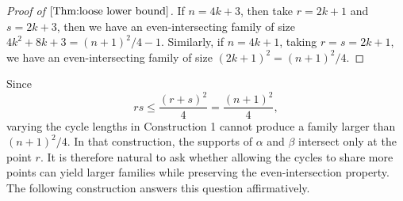 \documentclass[12pt]{article}
\theoremstyle{definition}
\newcommand{\1}{\mathbf 1}
\begin{document}
\begin{proof}[Proof of $\Cref{Thm:loose lower bound}$]
    If $n=4k+3$, then take $r=2k+1$ and $s=2k+3$, then we have an even-intersecting family of size $4k^2+8k+3=(n+1)^2/4-1$. Similarly, if $n=4k+1$, taking $r=s=2k+1$, we have an even-intersecting family of size $(2k+1)^2=(n+1)^2/4$.
\end{proof}


Since $$rs\leq \frac{(r+s)^2}{4}=\frac{(n+1)^2}{4},$$ varying the cycle lengths in Construction 1 cannot produce a family larger than $(n+1)^2/4$. In that construction, the supports of $\alpha$ and $\beta$ intersect only at the point $r$. It is therefore natural to ask whether allowing the cycles to share more points can yield larger families while preserving the even-intersection property. The following construction answers this question affirmatively.
\end{document}
